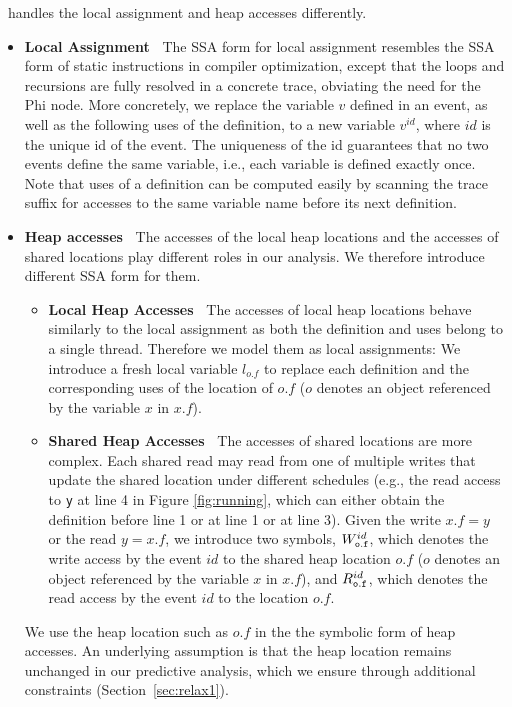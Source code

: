 \tool\ handles the local assignment and heap accesses differently.
\begin{itemize}
\item {\bf Local Assignment\ } The SSA form for local assignment resembles the SSA form of static instructions in compiler optimization, except that the loops and recursions are fully resolved in a concrete trace, obviating the need for the {\sf Phi} node. More concretely, we replace the variable $v$ defined in an event, as well as the following uses of the definition, to a new variable $v^{id}$, where $id$ is the unique id of the event. The uniqueness of the id guarantees that no two events define the same variable, i.e., each variable is defined exactly once. Note that uses of a definition can be computed easily by scanning the trace suffix for accesses to the same variable name before its next definition. 
\item {\bf Heap accesses\ } The accesses of the local heap locations and the accesses of shared locations play different roles in our analysis. We therefore introduce different SSA form for them. 
\begin{itemize}
\item {\bf Local Heap Accesses\ } The accesses of local heap locations behave similarly to the local assignment as both the definition and uses belong to a single thread. Therefore we model them as local assignments: We introduce a fresh local variable {\tt $l_{o.f }$} to replace each definition and  the corresponding uses of the location of $o.f$ ($o$ denotes an object referenced by the variable $x$ in $x.f$).  
\item  {\bf Shared Heap Accesses\ } The accesses of shared locations are more complex. Each shared read may read from one of multiple writes that update the shared location under different schedules (e.g., the read access to {\tt y} at line 4 in Figure \ref{fig:running}, which can either obtain the definition before line 1 or at line 1 or at line 3).   Given the write $x.f=y$ or the read $y=x.f$, we introduce two symbols, $W^{id}_{\tt o.f }$, which denotes the write access by the event $id$ to the  shared heap location  $o.f$  ($o$ denotes an object referenced by the variable $x$ in $x.f$), and $R^{id}_{\tt  o.f }$,  which denotes the read access  by the event $id$ to the location $o.f$. 
\end{itemize}
We use the heap location such as $o.f$ in the the symbolic form of heap accesses. An underlying assumption is that the heap location remains unchanged in our predictive analysis, which we ensure through additional constraints (Section~\ref{sec:relax1}).
\end{itemize}


